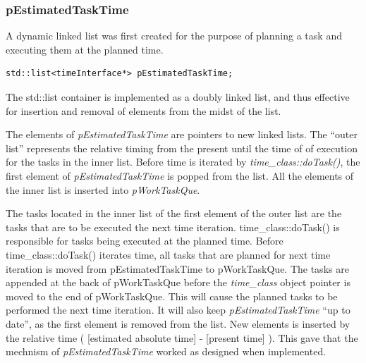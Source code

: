 	\subsubsection{pEstimatedTaskTime}
	A dynamic linked list was first created for the purpose of planning a task and executing them at the planned time.
\begin{lstlisting}
std::list<timeInterface*> pEstimatedTaskTime;
\end{lstlisting}
	The std::list container is implemented as a doubly linked list\cite{Stroustrup2000KAP16}, and thus effective for insertion and removal of elements from the midst of the list.

	The elements of \emph{pEstimatedTaskTime} are pointers to new linked lists.
	The ``outer list'' represents the relative timing from the present until the time of of execution for the tasks in the inner list.
	Before time is iterated by \emph{time\_class::doTask()}, the first element of \emph{pEstimatedTaskTime} is popped from the list. 
	All the elements of the inner list is inserted into \emph{pWorkTaskQue}.




	The tasks located in the inner list of the first element of the outer list are the tasks that are to be executed the next time iteration.
	time\_class::doTask() is responsible for tasks being executed at the planned time. 
	Before time\_class::doTask() iterates time, all tasks that are planned for next time iteration is moved from pEstimatedTaskTime to pWorkTaskQue.
	The tasks are appended at the back of pWorkTaskQue before the \emph{time\_class} object pointer is moved to the end of pWorkTaskQue. 
	This will cause the planned tasks to be performed the next time iteration.
	It will also keep \emph{pEstimatedTaskTime} ``up to date'', as the first element is removed from the list.
	New elements is inserted by the relative time ( [estimated absolute time] - [present time] ).
	This gave that the mechnism of \emph{pEstimatedTaskTime} worked as designed when implemented.

